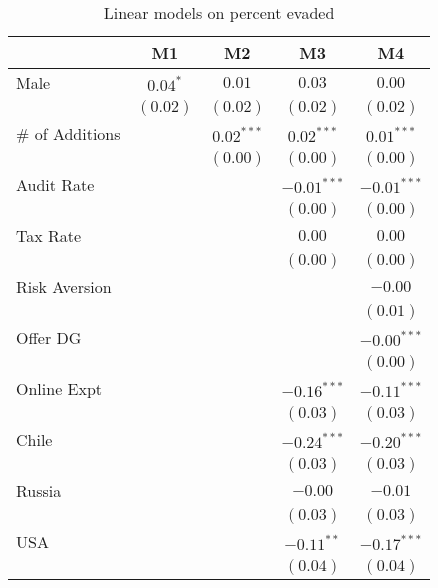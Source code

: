 
\begin{table}
\caption{Linear models on percent evaded}
\begin{center}
\begin{tabular}{l c c c c }
\hline
 & M1 & M2  & M3 & M4 \\
\hline
Male            & $0.04^{*}$   & $0.01$       & $0.03$        & $0.00$        \\
                & $(0.02)$     & $(0.02)$     & $(0.02)$      & $(0.02)$      \\
\# of Additions &              & $0.02^{***}$ & $0.02^{***}$  & $0.01^{***}$  \\
                &              & $(0.00)$     & $(0.00)$      & $(0.00)$      \\
Audit Rate      &              &              & $-0.01^{***}$ & $-0.01^{***}$ \\
                &              &              & $(0.00)$      & $(0.00)$      \\
Tax Rate        &              &              & $0.00$        & $0.00$        \\
                &              &              & $(0.00)$      & $(0.00)$      \\
Risk Aversion   &              &              &               & $-0.00$       \\
                &              &              &               & $(0.01)$      \\
Offer DG        &              &              &               & $-0.00^{***}$ \\
                &              &              &               & $(0.00)$      \\
Online Expt     &              &              & $-0.16^{***}$ & $-0.11^{***}$ \\
                &              &              & $(0.03)$      & $(0.03)$      \\
Chile           &              &              & $-0.24^{***}$ & $-0.20^{***}$ \\
                &              &              & $(0.03)$      & $(0.03)$      \\
Russia          &              &              & $-0.00$       & $-0.01$       \\
                &              &              & $(0.03)$      & $(0.03)$      \\
USA             &              &              & $-0.11^{**}$  & $-0.17^{***}$ \\
                &              &              & $(0.04)$      & $(0.04)$      \\

\end{tabular}
\end{center}
\end{table}
